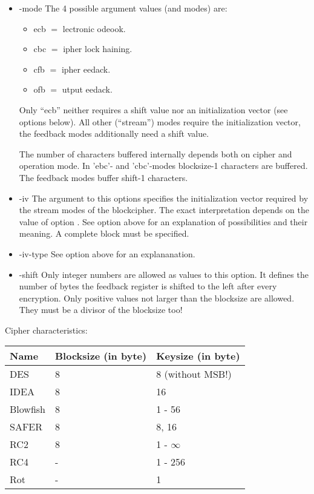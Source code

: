 \documentclass {report}
\begin{document}
\begin {itemize}
\item [-mode]	The 4 possible argument values (and modes) are:

	\begin {itemize}
	\item [ecb]	$=$ lectronic odeook.
	\item [cbc]	$=$ ipher lock haining.
	\item [cfb]	$=$ ipher eedack.
	\item [ofb]	$=$ utput eedack.
	\end   {itemize}

		Only ``ecb'' neither requires a shift value nor an
		initialization vector (see options below). All other
		(``stream'') modes require the initialization vector,
		the feedback modes additionally need a shift value.

		The number of characters buffered internally depends
		both on cipher and operation mode. In 'ebc'- and
		'cbc'-modes blocksize-1 characters are buffered. The
		feedback modes buffer shift-1 characters.


\item [-iv]	The argument to this options specifies the
		initialization vector required by the stream modes of
		the blockcipher. The exact interpretation depends
		on the value of option . See option
		 above for an explanation of possibilities
		and their meaning. A complete block must be specified.

\item [-iv-type]	See option  above for an
			explananation.

\item [-shift]	Only integer numbers are allowed as values to this
		option. It defines the number of bytes the feedback
		register is shifted to the left after every
		encryption. Only positive values not larger than the
		blocksize are allowed. They must be a divisor of the
		blocksize too!
\end   {itemize}


Cipher characteristics:

\begin {center}
	\begin {tabular}{|l|l|l|}\hline
	Name		& Blocksize (in byte)	& Keysize (in byte) \\ \hline\hline
	DES		& 8			& 8 (without MSB!) \\ \hline
	IDEA		& 8			& 16 \\ \hline
	Blowfish	& 8			& 1 - 56 \\ \hline
	SAFER		& 8			& 8, 16 \\ \hline
	RC2		& 8			& 1 - $\infty$ \\ \hline\hline
	RC4		& -			& 1 - 256 \\ \hline
	Rot		& -			& 1	\\ \hline
	\end   {tabular}
\end   {center}
\end{document}
